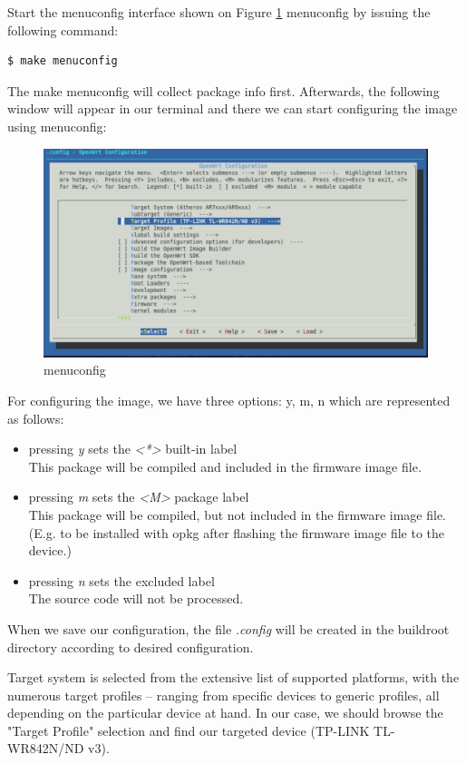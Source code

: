 Start the menuconfig interface shown on Figure \ref{fig_menuconfig} menuconfig by issuing the following command:
\begin{lstlisting}[columns=fixed,basicstyle=\ttfamily\footnotesize,tabsize=4,backgroundcolor=\color{yellow!10}]
$ make menuconfig
\end{lstlisting}
The make menuconfig will collect package info first. %
Afterwards, the following window will appear in our terminal and there we can start configuring the image using menuconfig:
\begin{figure}[h]
    \centering
    \includegraphics[scale=0.6]{figures/make_menuconfig.pdf}
    \caption{menuconfig}
    \label{fig_menuconfig}
\end{figure}

For configuring the image, we have three options: y, m, n which are represented as follows:
\begin{itemize}
\item pressing {\it y} sets the {\it <*>} built-in label\\
This package will be compiled and included in the firmware image file.
\item pressing {\it m} sets the {\it <M>} package label\\
This package will be compiled, but not included in the firmware image file. (E.g. to be installed with opkg after flashing the firmware image file to the device.)
\item pressing {\it n} sets the {\it < >} excluded label\\
The source code will not be processed.
\end{itemize}
When we save our configuration, the file {\it .config} will be created in the buildroot directory according to desired configuration.

Target system is selected from the extensive list of supported platforms, with the numerous target profiles – ranging from specific devices to generic profiles, all depending on the particular device at hand.
In our case, we should browse the "Target Profile" selection and find our targeted device (TP-LINK TL-WR842N/ND v3).

